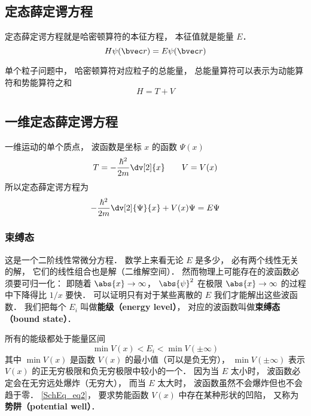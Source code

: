 
\begin{issues}
\issueTODO
\issueAbstract
\end{issues}


\subsection{定态薛定谔方程}
定态薛定谔方程就是哈密顿算符的本征方程， 本征值就是能量 $E$．
\begin{equation}
H \psi(\bvec r) = E \psi(\bvec r)
\end{equation}

单个粒子问题中， 哈密顿算符对应粒子的总能量， 总能量算符可以表示为动能算符和势能算符之和
\begin{equation}
H = T + V
\end{equation}

\subsection{一维定态薛定谔方程}
一维运动的单个质点， 波函数是坐标 $x$ 的函数 $\Psi(x)$
\begin{equation}
T = -\frac{\hbar^2}{2m} \dv[2]{x} \qquad V = V(x)
\end{equation}
所以定态薛定谔方程为
\begin{equation}\label{SchEq_eq1}
-\frac{\hbar^2}{2m} \dv[2]{\Psi}{x} + V(x)\Psi = E \Psi
\end{equation}

\subsubsection{束缚态}
这是一个二阶线性常微分方程． 数学上来看无论 $E$ 是多少， 必有两个线性无关的解， 它们的线性组合也是解（二维解空间）． 然而物理上可能存在的波函数必须要可归一化： 即随着 $\abs{x} \to \infty$，  $\abs{\psi}^2$ 在极限 $\abs{x}\to\infty$ 的过程中下降得比 $1/x$ 要快． 可以证明只有对于某些离散的 $E$ 我们才能解出这些波函数． 我们把每个 $E_i$ 叫做\textbf{能级（energy level）}， 对应的波函数叫做\textbf{束缚态（bound state）}．

所有的能级都处于能量区间
\begin{equation}\label{SchEq_eq2}
\min V(x) < E_i < \min V(\pm\infty)
\end{equation}
其中 $\min V(x)$ 是函数 $V(x)$ 的最小值（可以是负无穷）， $\min V(\pm\infty)$ 表示 $V(x)$ 的正无穷极限和负无穷极限中较小的一个． 因为当 $E$ 太小时， 波函数必定会在无穷远处爆炸（无穷大）， 而当 $E$ 太大时， 波函数虽然不会爆炸但也不会趋于零． \autoref{SchEq_eq2}， 要求势能函数 $V(x)$ 中存在某种形状的凹陷， 又称为\textbf{势阱（potential well）}．

